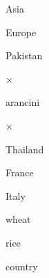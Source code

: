\documentclass[a4paper,portrait,12pt]{article}
\begin{document}
\begin{flushleft}
Asia
\end{flushleft}





\begin{flushleft}
Europe
\end{flushleft}





\begin{flushleft}
Pakistan
\end{flushleft}





×





\begin{flushleft}
arancini
\end{flushleft}





×





\begin{flushleft}
Thailand
\end{flushleft}





\begin{flushleft}
France
\end{flushleft}





\begin{flushleft}
Italy
\end{flushleft}





\begin{flushleft}
wheat
\end{flushleft}





\begin{flushleft}
rice
\end{flushleft}





\begin{flushleft}
country
\end{flushleft}
\end{document}
